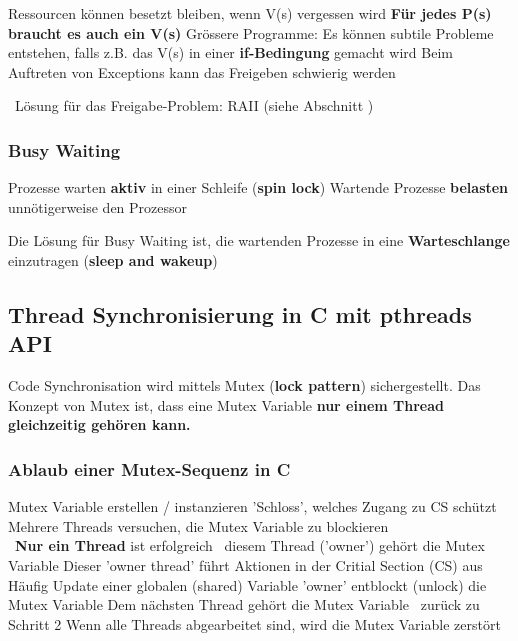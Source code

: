 \begin{outline}
    \1 Ressourcen können besetzt bleiben, wenn V(s) vergessen wird
        \2 \textbf{Für jedes P(s) braucht es auch ein V(s)}
    \1 Grössere Programme: Es können subtile Probleme entstehen, falls z.B. das V(s) in einer \textbf{if-Bedingung} gemacht wird
    \1 Beim Auftreten von Exceptions kann das Freigeben schwierig werden
\end{outline}

\vspace{0.1cm}

\textrightarrow\ Lösung für das Freigabe-Problem: RAII (siehe Abschnitt )   %


\subsubsection{Busy Waiting}

\begin{outline}
    \1 Prozesse warten \textbf{aktiv} in einer Schleife (\textbf{spin lock})
        \2 Wartende Prozesse \textbf{belasten} unnötigerweise den Prozessor
\end{outline}

\vspace{0.1cm}

Die Lösung für Busy Waiting ist, die wartenden Prozesse in eine \textbf{Warteschlange} einzutragen (\textbf{sleep and wakeup})


\subsection{Thread Synchronisierung in C mit pthreads API}

Code Synchronisation wird mittels Mutex (\textbf{lock pattern}) sichergestellt. 
Das Konzept von Mutex ist, dass eine Mutex Variable \textbf{nur einem Thread gleichzeitig gehören kann.}


\subsubsection{Ablaub einer Mutex-Sequenz in C}

\begingroup
\renewcommand{\outlinei}{enumerate}
\renewcommand{\outlineii}{itemize}
\begin{outline}
    \1 Mutex Variable erstellen / instanzieren
        \2 'Schloss', welches Zugang zu CS schützt
    \1 Mehrere Threads versuchen, die Mutex Variable zu blockieren \\
        \textrightarrow\ \textbf{Nur ein Thread} ist erfolgreich \textrightarrow\ diesem Thread ('owner') gehört die Mutex Variable 
    \1 Dieser 'owner thread' führt Aktionen in der Critial Section (CS) aus
        \2 Häufig Update einer globalen (shared) Variable
    \1 'owner' entblockt (unlock) die Mutex Variable
    \1 Dem nächsten Thread gehört die Mutex Variable \textrightarrow\ zurück zu Schritt 2
    \1 Wenn alle Threads abgearbeitet sind, wird die Mutex Variable zerstört
\end{outline}
\endgroup

